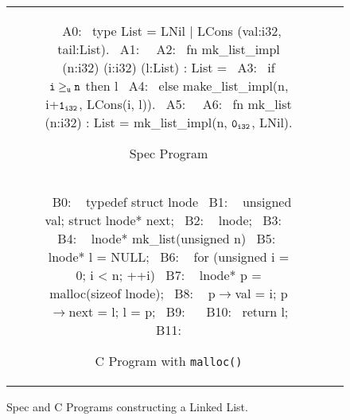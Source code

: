 \begin{figure}[H]
\begin{tabular}{cc}
\begin{subfigure}[b]{\textwidth}
\begin{center}
\begin{allLangEnvFoot}
~{\scriptsize \textcolor{mygray}{A0:}}~ type List = LNil | LCons (val:i32, tail:List).
~{\scriptsize \textcolor{mygray}{A1:}}~
~{\scriptsize \textcolor{mygray}{A2:}}~ fn mk_list_impl (n:i32) (i:i32) (l:List) : List =
~{\scriptsize \textcolor{mygray}{A3:}}~    if ${\tt i \geq_u n}$ then l
~{\scriptsize \textcolor{mygray}{A4:}}~             else make_list_impl(n, i+${\tt 1_{i32}}$, LCons(i, l)).
~{\scriptsize \textcolor{mygray}{A5:}}~
~{\scriptsize \textcolor{mygray}{A6:}}~ fn mk_list (n:i32) : List = mk_list_impl(n, ${\tt 0_{i32}}$, LNil).
\end{allLangEnvFoot}
\end{center}
\caption{\label{fig:llAllocSpec}Spec Program}
\end{subfigure}%
\\
\begin{subfigure}[b]{\textwidth}
\begin{center}
\begin{allLangEnvFoot}
~{\scriptsize \textcolor{mygray}{B0: }}~ typedef struct lnode {
~{\scriptsize \textcolor{mygray}{B1: }}~   unsigned val; struct lnode* next;
~{\scriptsize \textcolor{mygray}{B2: }}~ } lnode;
~{\scriptsize \textcolor{mygray}{B3: }}~ 
~{\scriptsize \textcolor{mygray}{B4: }}~ lnode* mk_list(unsigned n) {
~{\scriptsize \textcolor{mygray}{B5: }}~   lnode* l = NULL;
~{\scriptsize \textcolor{mygray}{B6: }}~   for (unsigned i = 0; i < n; ++i) {
~{\scriptsize \textcolor{mygray}{B7: }}~     lnode* p = malloc(sizeof lnode);
~{\scriptsize \textcolor{mygray}{B8: }}~     p$\rightarrow$val = i; p$\rightarrow$next = l; l = p;
~{\scriptsize \textcolor{mygray}{B9: }}~   }
~{\scriptsize \textcolor{mygray}{B10:}}~   return l;
~{\scriptsize \textcolor{mygray}{B11:}}~ }
\end{allLangEnvFoot}
\end{center}
\caption{\label{fig:llAllocC}C Program with {\tt malloc()}}
\end{subfigure}%
\\
\end{tabular}
\caption{\label{fig:llAllocSpecAndC}Spec and C Programs constructing a Linked List.}
\end{figure}
